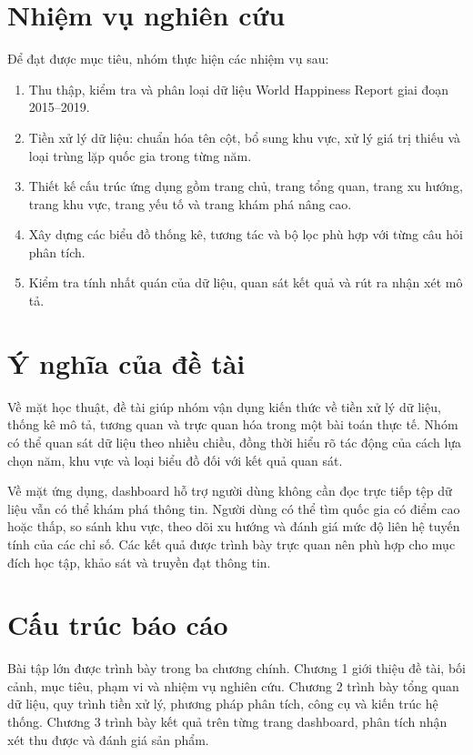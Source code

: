 \section{Nhiệm vụ nghiên cứu}

Để đạt được mục tiêu, nhóm thực hiện các nhiệm vụ sau:

\begin{enumerate}
    \item Thu thập, kiểm tra và phân loại dữ liệu World Happiness Report giai đoạn 2015--2019.
    \item Tiền xử lý dữ liệu: chuẩn hóa tên cột, bổ sung khu vực, xử lý giá trị thiếu và loại trùng lặp quốc gia trong từng năm.
    \item Thiết kế cấu trúc ứng dụng gồm trang chủ, trang tổng quan, trang xu hướng, trang khu vực, trang yếu tố và trang khám phá nâng cao.
    \item Xây dựng các biểu đồ thống kê, tương tác và bộ lọc phù hợp với từng câu hỏi phân tích.
    \item Kiểm tra tính nhất quán của dữ liệu, quan sát kết quả và rút ra nhận xét mô tả.
\end{enumerate}

\section{Ý nghĩa của đề tài}

Về mặt học thuật, đề tài giúp nhóm vận dụng kiến thức về tiền xử lý dữ liệu, thống kê mô tả, tương quan và trực quan hóa trong một bài toán thực tế. Nhóm có thể quan sát dữ liệu theo nhiều chiều, đồng thời hiểu rõ tác động của cách lựa chọn năm, khu vực và loại biểu đồ đối với kết quả quan sát.

Về mặt ứng dụng, dashboard hỗ trợ người dùng không cần đọc trực tiếp tệp dữ liệu vẫn có thể khám phá thông tin. Người dùng có thể tìm quốc gia có điểm cao hoặc thấp, so sánh khu vực, theo dõi xu hướng và đánh giá mức độ liên hệ tuyến tính của các chỉ số. Các kết quả được trình bày trực quan nên phù hợp cho mục đích học tập, khảo sát và truyền đạt thông tin.

\section{Cấu trúc báo cáo}

Bài tập lớn được trình bày trong ba chương chính. Chương 1 giới thiệu đề tài, bối cảnh, mục tiêu, phạm vi và nhiệm vụ nghiên cứu. Chương 2 trình bày tổng quan dữ liệu, quy trình tiền xử lý, phương pháp phân tích, công cụ và kiến trúc hệ thống. Chương 3 trình bày kết quả trên từng trang dashboard, phân tích nhận xét thu được và đánh giá sản phẩm.


